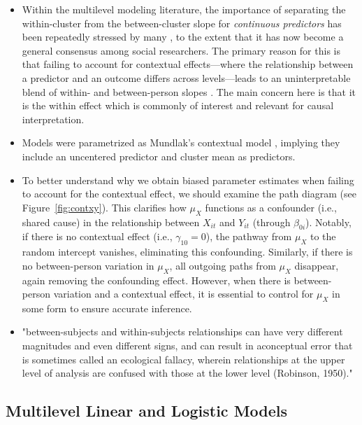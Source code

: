 \documentclass[stu]{apa7}
\begin{document}
\begin{itemize}
    \item Within the multilevel modeling literature, the importance of separating the within-cluster from the between-cluster slope for \textit{continuous predictors} has been repeatedly stressed by many \parencite[e.g.,][]{enders_centering_2007, kreft_effect_1995, raudenbush_hierarchical_2002}, to the extent that it has now become a general consensus among social researchers. The primary reason for this is that failing to account for contextual effects—where the relationship between a predictor and an outcome differs across levels—leads to an uninterpretable blend of within- and between-person slopes \parencite[139]{raudenbush_hierarchical_2002}.  The main concern here is that it is the within effect which is commonly of interest and relevant for causal interpretation.
    \item Models were parametrized as Mundlak's contextual model \parencite[]{mundlak_pooling_1978}, implying they include an uncentered predictor and cluster mean as predictors.
    \item To better understand why we obtain biased parameter estimates when failing to account for the contextual effect, we should examine the path diagram (see Figure~\ref{fig:contxy}). This clarifies how \( \mu_X \) functions as a confounder (i.e., shared cause) in the relationship between \( X_{it} \) and $Y_{it}$ (through \( \beta_{0i} \)). Notably, if there is no contextual effect (i.e., \( \gamma_{10} = 0 \)), the pathway from \( \mu_X \) to the random intercept vanishes, eliminating this confounding. Similarly, if there is no between-person variation in \( \mu_X \), all outgoing paths from \( \mu_X \) disappear, again removing the confounding effect. However, when there is between-person variation and a contextual effect, it is essential to control for \( \mu_X \) in some form to ensure accurate inference.
    \item "between-subjects and within-subjects relationships can have very different magnitudes and even different signs, and can result in aconceptual error that is sometimes called an ecological fallacy, wherein relationships at the upper level of analysis are confused with those at the lower level (Robinson, 1950)." \parencite[p. 71]{bolger_intensive_2013}
\end{itemize}


\subsection{Multilevel Linear and Logistic Models}
\end{document}
